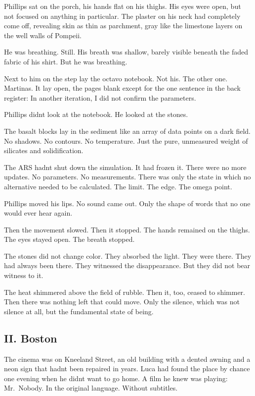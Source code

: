 \documentclass[
  ngerman,
]{article}
\begin{document}
Phillips sat on the porch, his hands flat on his thighs. His eyes were
open, but not focused on anything in particular. The plaster on his neck
had completely come off, revealing skin as thin as parchment, gray like
the limestone layers on the well walls of Pompeii.

He was breathing. Still. His breath was shallow, barely visible beneath
the faded fabric of his shirt. But he was breathing.

Next to him on the step lay the octavo notebook. Not his. The other one.
Martina\textquotesingle s. It lay open, the pages blank except for the
one sentence in the back register: In another iteration, I did not
confirm the parameters.

Phillips didn\textquotesingle t look at the notebook. He looked at the
stones.

The basalt blocks lay in the sediment like an array of data points on a
dark field. No shadows. No contours. No temperature. Just the pure,
unmeasured weight of silicates and solidification.

The ARS hadn\textquotesingle t shut down the simulation. It had frozen
it. There were no more updates. No parameters. No measurements. There
was only the state in which no alternative needed to be calculated. The
limit. The edge. The omega point.

Phillips moved his lips. No sound came out. Only the shape of words that
no one would ever hear again.

Then the movement slowed. Then it stopped. The hands remained on the
thighs. The eyes stayed open. The breath stopped.

The stones did not change color. They absorbed the light. They were
there. They had always been there. They witnessed the disappearance. But
they did not bear witness to it.

The heat shimmered above the field of rubble. Then it, too, ceased to
shimmer. Then there was nothing left that could move. Only the silence,
which was not silence at all, but the fundamental state of being.

\subsection{II. Boston}\label{ii.-boston}

The cinema was on Kneeland Street, an old building with a dented awning
and a neon sign that hadn\textquotesingle t been repaired in years. Luca
had found the place by chance one evening when he didn\textquotesingle t
want to go home. A film he knew was playing: Mr.~Nobody. In the original
language. Without subtitles.
\end{document}
